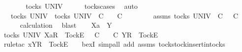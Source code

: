 \ \ \isamarkupfalse%
\ \isamarkupfalse%
\ {\isachardoublequoteopen}{\isasymrho}\ {\isasymin}\ tocks\ UNIV{\isachardoublequoteclose}\isanewline
\ \ \ \ \isamarkupfalse%
\ tocks{\isachardot}cases\ \isamarkupfalse%
\ auto\isanewline
\ \ \isamarkupfalse%
\ \isamarkupfalse%
\ {\isachardoublequoteopen}{\isasymrho}\ {\isasymin}\ tocks\ UNIV\ {\isasymLongrightarrow}\ {\isasymexists}{\isasymrho}{\isacharprime}{\isasymin}tocks\ UNIV{\isachardot}\ {\isasymrho}\ {\isasymlesssim}\isactrlsub C\ {\isasymrho}{\isacharprime}\ {\isasymand}\ {\isasymrho}{\isacharprime}\ {\isasymle}\isactrlsub C\ {\isasymsigma}{\isachardoublequoteclose}\isanewline
\ \ \isamarkupfalse%
\ \isamarkupfalse%
\ {\isasymrho}{\isacharprime}\ \ {\isasymrho}{\isacharprime}{\isacharunderscore}assms{\isacharcolon}\ {\isachardoublequoteopen}{\isasymrho}{\isacharprime}{\isasymin}tocks\ UNIV{\isachardoublequoteclose}\ {\isachardoublequoteopen}{\isasymrho}\ {\isasymlesssim}\isactrlsub C\ {\isasymrho}{\isacharprime}{\isachardoublequoteclose}\ {\isachardoublequoteopen}{\isasymrho}{\isacharprime}\ {\isasymle}\isactrlsub C\ {\isasymsigma}{\isachardoublequoteclose}\isanewline
\ \ \ \ \isamarkupfalse%
\ calculation\ \isamarkupfalse%
\ blast\isanewline
\ \ \isamarkupfalse%
\ {\isachardoublequoteopen}Xa\ {\isasymsubseteq}\ Y{\isachardoublequoteclose}\isanewline
\ \ \isamarkupfalse%
\ \isamarkupfalse%
\ {\isachardoublequoteopen}{\isasymexists}{\isasymrho}{\isacharprime}{\isasymin}tocks\ UNIV{\isachardot}\ {\isacharbrackleft}Xa{\isacharbrackright}\isactrlsub R\ {\isacharhash}\ {\isacharbrackleft}Tock{\isacharbrackright}\isactrlsub E\ {\isacharhash}\ {\isasymrho}\ {\isasymlesssim}\isactrlsub C\ {\isasymrho}{\isacharprime}\ {\isasymand}\ {\isasymrho}{\isacharprime}\ {\isasymle}\isactrlsub C\ {\isacharbrackleft}Y{\isacharbrackright}\isactrlsub R\ {\isacharhash}\ {\isacharbrackleft}Tock{\isacharbrackright}\isactrlsub E\ {\isacharhash}\ {\isasymsigma}{\isachardoublequoteclose}\isanewline
\ \ \ \ \isamarkupfalse%
\ {\isacharparenleft}rule{\isacharunderscore}tac\ x{\isacharequal}{\isachardoublequoteopen}{\isacharbrackleft}Y{\isacharbrackright}\isactrlsub R\ {\isacharhash}\ {\isacharbrackleft}Tock{\isacharbrackright}\isactrlsub E\ {\isacharhash}\ {\isasymrho}{\isacharprime}{\isachardoublequoteclose}\ \ bexI{\isacharcomma}\ simp{\isacharunderscore}all\ add{\isacharcolon}\ {\isasymrho}{\isacharprime}{\isacharunderscore}assms\ tocks{\isachardot}tock{\isacharunderscore}insert{\isacharunderscore}in{\isacharunderscore}tocks{\isacharparenright}\isanewline
